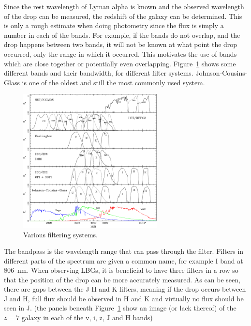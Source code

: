 			Since the rest wavelength of Lyman alpha is known and the observed wavelength of the drop can be measured, the redshift of the galaxy can be determined. This
			is only a rough estimate when doing photometry since the flux is simply a number in each of the bands. For example, if the bands do not overlap, and the drop happens between two bands, it will not be known at what point the drop occurred, only the range in which it occurred. This motivates the use of bands which are close together or potentially even overlapping. Figure~\ref{fig:filter-systems} shows some different bands and their bandwidth, for different filter systems. Johnson-Cousins- Glass is one of the oldest and still the most commonly used system\cite{BasicObservationalKnowledge}.
			\begin{figure}[htbp]
				\centering
				\includegraphics[width=0.65\textwidth]{../Images/filter-systems.png}
				\caption{Various filtering systems\cite{refId0}.\label{fig:filter-systems}}
			\end{figure}

			The bandpass is the wavelength range that can pass through the filter. Filters in different parts of the spectrum are given a common name, for example I band at \SI{806}{\nano\metre}. When observing LBGs, it is beneficial to have three filters in a row so that the position of the drop can be more accurately measured. As can be seen, there are gaps between the J H and K filters, meaning if the drop occurs between J and H, full flux should be observed in H and K and virtually no flux should be seen in J. (the panels beneath Figure~\ref{fig:filter-systems} show an image (or lack thereof) of the $z=7$ galaxy in each of the v, i, z, J and H bands)

